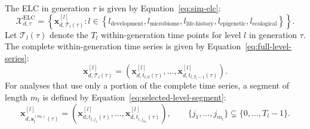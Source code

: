 \documentclass[11pt]{article}
\newcommand{\ELC}{\mathrm{ELC}}
\begin{document}
The ELC in generation $\tau$ is given by Equation~\ref{eq:sim-elc}:
\begin{equation}
\mathcal{X}^{\ELC}_{d,\tau}
=
\left\{
\mathbf{x}^{[l]}_{d,\mathcal{T}_l(\tau)}
:
l\in
\left\{
l_{\mathrm{development}},
l_{\mathrm{microbiome}},
l_{\mathrm{life\text{-}history}},
l_{\mathrm{epigenetic}},
l_{\mathrm{ecological}}
\right\}
\right\}.
\label{eq:sim-elc}
\end{equation}
Let $\mathcal{T}_l(\tau)$ denote the $T_l$ within-generation time points for level $l$ in generation $\tau$. The complete within-generation time series is given by Equation~\ref{eq:full-level-series}:
\begin{equation}
\mathbf{x}^{[l]}_{d,\mathcal{T}_l(\tau)}
=
\left(
\mathbf{x}^{[l]}_{d,t_{l,0}(\tau)},
\ldots,
\mathbf{x}^{[l]}_{d,t_{l,T_l-1}(\tau)}
\right).
\label{eq:full-level-series}
\end{equation}
For analyses that use only a portion of the complete time series, a segment of length $m_l$ is defined by Equation~\ref{eq:selected-level-segment}:
\begin{equation}
\mathbf{x}^{[l]}_{d,\mathbf{s}^{(m_l)}_l(\tau)}
=
\left(
\mathbf{x}^{[l]}_{d,t_{l,j_1}(\tau)},
\ldots,
\mathbf{x}^{[l]}_{d,t_{l,j_{m_l}}(\tau)}
\right),
\qquad
\{j_1,\ldots,j_{m_l}\}
\subsetneq
\{0,\ldots,T_l-1\}.
\label{eq:selected-level-segment}
\end{equation}
\end{document}
